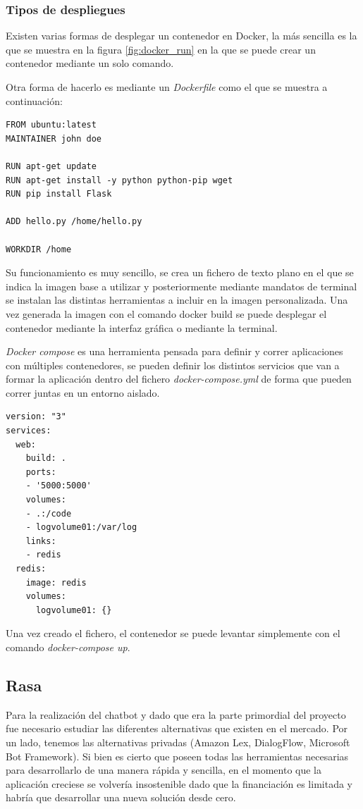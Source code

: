 \subsubsection{Tipos de despliegues}
Existen varias formas de desplegar un contenedor en Docker, la más sencilla es la que se muestra en la figura \ref{fig:docker_run} en la que se puede crear un contenedor mediante un solo comando. 

Otra forma de hacerlo es mediante un \textit{Dockerfile} como el que se muestra a continuación:

\begin{lstlisting}
FROM ubuntu:latest
MAINTAINER john doe 

RUN apt-get update
RUN apt-get install -y python python-pip wget
RUN pip install Flask

ADD hello.py /home/hello.py

WORKDIR /home
\end{lstlisting}

Su funcionamiento es muy sencillo, se crea un fichero de texto plano en el que se indica la imagen base a utilizar y posteriormente mediante mandatos de terminal se instalan las distintas herramientas a incluir en la imagen personalizada. Una vez generada la imagen con el comando docker build se puede desplegar el contenedor mediante la interfaz gráfica o mediante la terminal.

\textit{Docker compose} es una herramienta pensada para definir y correr aplicaciones con múltiples contenedores, se pueden definir los distintos servicios que van a formar la aplicación dentro del fichero \textit{docker-compose.yml} de forma que pueden correr juntas en un entorno aislado.

\vspace{.7cm}
\begin{lstlisting}
version: "3"
services:
  web:
    build: .
    ports:
    - '5000:5000'
    volumes:
    - .:/code
    - logvolume01:/var/log
    links:
    - redis
  redis:
    image: redis
    volumes:
      logvolume01: {}
\end{lstlisting}

Una vez creado el fichero, el contenedor se puede levantar simplemente con el comando \textit{docker-compose up}.

\subsection{Rasa}

Para la realización del chatbot y dado que era la parte primordial del proyecto fue necesario estudiar las diferentes alternativas que existen en el mercado. Por un lado, tenemos las alternativas privadas (Amazon Lex, DialogFlow, Microsoft Bot Framework). Si bien es cierto que poseen todas las herramientas necesarias para desarrollarlo de una manera rápida y sencilla, en el momento que la aplicación creciese se volvería insostenible dado que la financiación es limitada y habría que desarrollar una nueva solución desde cero.

